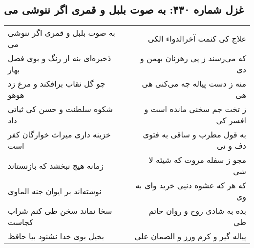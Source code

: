 \begin{center}
\section*{غزل شماره ۴۳۰: به صوت بلبل و قمری اگر ننوشی می}
\label{sec:sh430}
\begin{longtable}{l p{0.5cm} r}
به صوت بلبل و قمری اگر ننوشی می
&&
علاج کی کنمت آخرالدواء الکی
\\
ذخیره‌ای بنه از رنگ و بوی فصل بهار
&&
که می‌رسند ز پی رهزنان بهمن و دی
\\
چو گل نقاب برافکند و مرغ زد هوهو
&&
منه ز دست پیاله چه می‌کنی هی هی
\\
شکوه سلطنت و حسن کی ثباتی داد
&&
ز تخت جم سخنی مانده است و افسر کی
\\
خزینه داری میراث خوارگان کفر است
&&
به قول مطرب و ساقی به فتوی دف و نی
\\
زمانه هیچ نبخشد که بازنستاند
&&
مجو ز سفله مروت که شیئه لا شی
\\
نوشته‌اند بر ایوان جنه الماوی
&&
که هر که عشوه دنیی خرید وای به وی
\\
سخا نماند سخن طی کنم شراب کجاست
&&
بده به شادی روح و روان حاتم طی
\\
بخیل بوی خدا نشنود بیا حافظ
&&
پیاله گیر و کرم ورز و الضمان علی
\\
\end{longtable}
\end{center}
